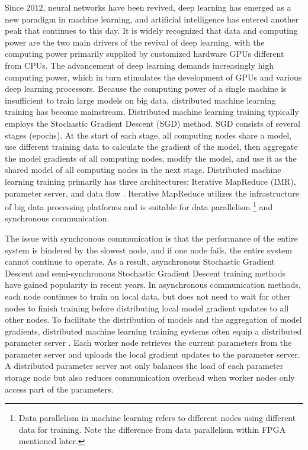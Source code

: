 Since 2012, neural networks have been revived, deep learning has emerged as a new paradigm in machine learning, and artificial intelligence has entered another peak that continues to this day.
It is widely recognized that data and computing power are the two main drivers of the revival of deep learning, with the computing power primarily supplied by customized hardware GPUs different from CPUs.
The advancement of deep learning demands increasingly high computing power, which in turn stimulates the development of GPUs and various deep learning processors.
Because the computing power of a single machine is insufficient to train large models on big data, distributed machine learning training has become mainstream.
Distributed machine learning training typically employs the Stochastic Gradient Descent (SGD) method. SGD consists of several stages (epochs). At the start of each stage, all computing nodes share a model, use different training data to calculate the gradient of the model, then aggregate the model gradients of all computing nodes, modify the model, and use it as the shared model of all computing nodes in the next stage.
Distributed machine learning training primarily has three architectures: Iterative MapReduce (IMR), parameter server, and data flow \cite{distributed-ml}.
Iterative MapReduce utilizes the infrastructure of big data processing platforms and is suitable for data parallelism \footnote{Data parallelism in machine learning refers to different nodes using different data for training. Note the difference from data parallelism within FPGA mentioned later.} and synchronous communication.

The issue with synchronous communication is that the performance of the entire system is hindered by the slowest node, and if one node fails, the entire system cannot continue to operate. As a result, asynchronous Stochastic Gradient Descent and semi-synchronous Stochastic Gradient Descent training methods have gained popularity in recent years. In asynchronous communication methods, each node continues to train on local data, but does not need to wait for other nodes to finish training before distributing local model gradient updates to all other nodes. To facilitate the distribution of models and the aggregation of model gradients, distributed machine learning training systems often equip a distributed parameter server \cite{li2014scaling}. Each worker node retrieves the current parameters from the parameter server and uploads the local gradient updates to the parameter server. A distributed parameter server not only balances the load of each parameter storage node but also reduces communication overhead when worker nodes only access part of the parameters.

